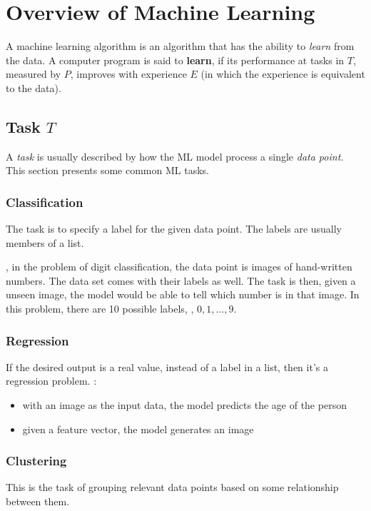 \chapter{Overview of Machine Learning}
\label{cha:overview-ml}

A machine learning algorithm is an algorithm that has the ability to \textit{learn} from the data. A computer program is said to \textbf{learn}, if its performance at tasks in $T$, measured by $P$, improves with experience $E$ (in which the experience is equivalent to the data). \cite{goodfellow2016deep}

\section{Task $T$}
A \textit{task} is usually described by how the \ac{ML} model process a single \textit{data point}. This section presents some common \ac{ML} tasks. \cite{vu2018mlcb}

\subsection{Classification}
The task is to specify a label for the given data point. The labels are usually members of a list.

\Eg, in the problem of digit classification, the data point is images of hand-written numbers. The data set comes with their labels as well. The task is then, given a unseen image, the model would be able to tell which number is in that image. In this problem, there are 10 possible labels, \ie, $0, 1, \dots, 9$.

\subsection{Regression}
If the desired output is a real value, instead of a label in a list, then it's a regression problem. \Eg:
\begin{itemize}
	\item with an image as the input data, the model predicts the age of the person
	\item given a feature vector, the model generates an image
\end{itemize}

\subsection{Clustering}
This is the task of grouping relevant data points based on some relationship between them.

